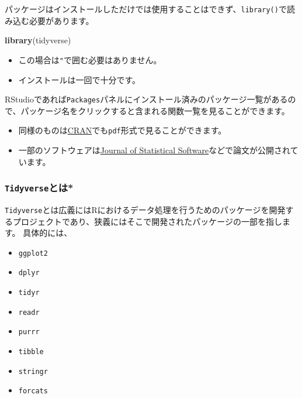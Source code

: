 \documentclass[]{bxjsarticle}
\newenvironment{Shaded}{\begin{snugshade}}{\end{snugshade}}
\newcommand{\KeywordTok}[1]{\textcolor[rgb]{0.13,0.29,0.53}{\textbf{#1}}}
\newcommand{\NormalTok}[1]{#1}
\providecommand{\tightlist}{%
  \setlength{\itemsep}{0pt}\setlength{\parskip}{0pt}}
\begin{document}
パッケージはインストールしただけでは使用することはできず、\texttt{library()}で読み込む必要があります。

\begin{Shaded}
\begin{Highlighting}[]
\KeywordTok{library}\NormalTok{(tidyverse)}
\end{Highlighting}
\end{Shaded}

\begin{itemize}
\tightlist
\item
  この場合は\texttt{"}で囲む必要はありません。
\item
  インストールは一回で十分です。
\end{itemize}

RStudioであれば\texttt{Packages}パネルにインストール済みのパッケージ一覧があるので、パッケージ名をクリックすると含まれる関数一覧を見ることができます。

\begin{itemize}
\tightlist
\item
  同様のものは\href{https://cran.r-project.org/}{CRAN}でも\texttt{pdf}形式で見ることができます。
\item
  一部のソフトウェアは\href{https://www.jstatsoft.org/index}{Journal of Statistical Software}などで論文が公開されています。
\end{itemize}

\hypertarget{tidyverseux3068ux306f}{%
\subsubsection{\texorpdfstring{\texttt{Tidyverse}とは*}{Tidyverseとは*}}\label{tidyverseux3068ux306f}}

\texttt{Tidyverse}とは広義にはRにおけるデータ処理を行うためのパッケージを開発するプロジェクトであり、狭義にはそこで開発されたパッケージの一部を指します。
具体的には、

\begin{itemize}
\tightlist
\item
  \texttt{ggplot2}
\item
  \texttt{dplyr}
\item
  \texttt{tidyr}
\item
  \texttt{readr}
\item
  \texttt{purrr}
\item
  \texttt{tibble}
\item
  \texttt{stringr}
\item
  \texttt{forcats}
\end{itemize}
\end{document}
